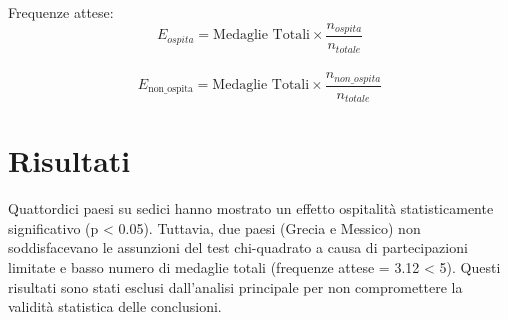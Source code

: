 Frequenze attese:
$$E_{ospita}=\text{Medaglie Totali} \times \frac{n_{ospita}}{n_{totale}}$$\\
$$E_{\text {non\_ospita}}=\text{Medaglie Totali} \times \frac{n_{non\_ospita}}
{n_{totale}}$$

\section{Risultati}
Quattordici paesi su sedici hanno mostrato un effetto ospitalità statisticamente 
significativo (p < 0.05). Tuttavia, due paesi (Grecia e Messico) non soddisfacevano 
le assunzioni del test chi-quadrato a causa di partecipazioni limitate e basso 
numero di medaglie totali (frequenze attese = 3.12 < 5). Questi risultati sono 
stati esclusi dall'analisi principale per non compromettere la validità statistica 
delle conclusioni.



